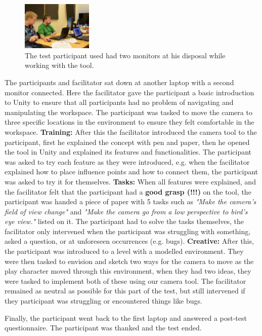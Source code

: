 \begin{figure}[htbp]
\centering
\includegraphics[width=0.3\textwidth]{Pics/test_setup}
\caption{The test participant used had two monitors at his disposal while working with the tool.}
\label{fig:framingConcept}
\end{figure}

The participants and facilitator sat down at another laptop with a second monitor connected. Here the facilitator gave the participant a basic introduction to Unity to ensure that all participants had no problem of navigating and manipulating the workspace. The participant was tasked to move the camera to three specific locations in the environment to ensure they felt comfortable in the workspace. \textbf{Training:} After this the facilitator introduced the camera tool to the participant, first he explained the concept with pen and paper, then he opened the tool in Unity and explained its features and functionalities. The participant was asked to try each feature as they were introduced, e.g. when the facilitator explained how to place influence points and how to connect them, the participant was asked to try it for themselves. \textbf{Tasks:} When all features were explained, and the facilitator felt that the participant had a \textbf{good grasp (!!!)} on the tool, the participant was handed a piece of paper with 5 tasks such as \textit{"Make the camera's field of view change"} and \textit{"Make the camera go from a low perspective to bird's eye view."} listed on it. The participant had to solve the tasks themselves, the facilitator only intervened when the participant was struggling with something, asked a question, or at unforeseen occurrences (e.g. bugs). \textbf{Creative:} After this, the participant was introduced to a level with a modelled environment. They were then tasked to envision and sketch two ways for the camera to move as the play character moved through this environment, when they had two ideas, they were tasked to implement both of these using our camera tool. The facilitator remained as neutral as possible for this part of the test, but still intervened if they participant was struggling or encountered things like bugs.

Finally, the participant went back to the first laptop and answered a post-test questionnaire. The participant was thanked and the test ended.

